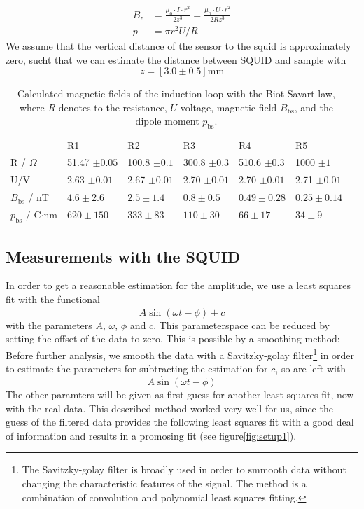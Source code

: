 \begin{align}
B_z     &= \frac{\mu_0\cdot I \cdot r^2}{2z^3} = \frac{\mu_0\cdot U \cdot r^2}{2Rz^3}\\ 
p       &= \pi r^2 U / R 
\end{align}
We assume that the vertical distance of the sensor to the squid is approximately zero, 
sucht that we can estimate the distance between SQUID and sample with
\begin{equation}
z = \left[ 3.0 \pm 0.5 \right]\mathrm{mm}
\end{equation}
\begin{table}[htb]
\caption{Calculated magnetic fields of the induction loop with the Biot-Savart law,
where $R$ denotes to the resistance, $U$ voltage, magnetic field $B_{\mathrm{bs}}$,
and the dipole moment $p_{\mathrm{bs}}$.
}
\begin{tabular}{ l| p{2cm}|p{2cm}|p{2cm}|p{2cm}|p{2cm}}
 \rowcolor{tabcolor}& R1 & R2 & R3 & R4 & R5 \\ 
R / $\Omega$ & 51.47  $\pm 0.05$ & 100.8  $\pm 0.1$& 300.8 $\pm 0.3$& 510.6 $\pm 0.3$ & 1000 $\pm 1$\\  
U/V           & 2.63 $\pm 0.01$ & 2.67 $\pm 0.01$& 2.70 $\pm 0.01$& 2.70 $\pm 0.01$& 2.71 $\pm 0.01$\\
$B_{\mathrm{bs}}$ / nT &$4.6 \pm 2.6$&$2.5 \pm 1.4$ &$0.8 \pm 0.5$ &$0.49 \pm 0.28$ &$0.25 \pm 0.14$ \\ 
$p_{\mathrm{bs}}$ / C$\cdot$nm &$620 \pm 150$ &$333 \pm 83$ &$110 \pm 30$ &$66 \pm 17$ &$34 \pm 9$\\
\end{tabular}
\end{table}

\subsection{Measurements with the SQUID}

In order to get a reasonable estimation for the amplitude, we use a least
squares fit with the functional
\begin{equation}
A \dot \sin (\omega t - \phi ) + c
\end{equation}
with the parameters $A$, $\omega$, $\phi$ and $c$. This parameterspace can be
reduced by setting the offset of the data to zero. This is possible by a 
smoothing method: Before further analysis, we smooth the data with a
Savitzky-golay filter\footnote{The Savitzky-golay filter is broadly used
in order to smmooth data without changing the characteristic features of the 
signal. The method is a combination of convolution and polynomial least
squares fitting.} in order to estimate the parameters for 
subtracting the estimation for $c$, so are left with
\begin{equation}
A \dot \sin (\omega t - \phi ) 
\end{equation}
The other paramters will be given as
first guess for another least squares fit, now with the real data. This
described method worked very well for us, since the guess of the filtered data
provides the following least squares fit with a good deal of information and
results in a promosing fit (see figure\ref{fig:setup1}). 


